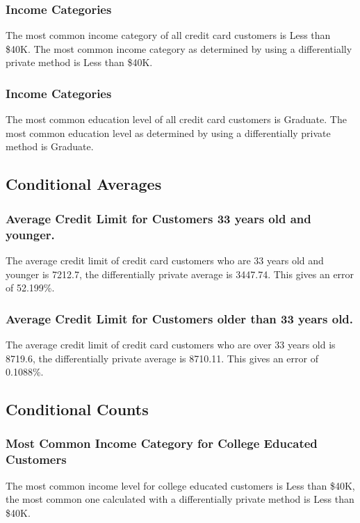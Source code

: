 \documentclass{article}%
\begin{document}
\subsubsection{Income Categories}%
\label{ssubsec:IncomeCategories}%
The most common income category of all credit card customers is Less than \$40K. The most common income category as determined by using a differentially private method is Less than \$40K.

%
\subsubsection{Income Categories}%
\label{ssubsec:IncomeCategories}%
The most common education level of all credit card customers is Graduate. The most common education level as determined by using a differentially private method is Graduate.

%
\subsection{Conditional Averages}%
\label{subsec:ConditionalAverages}%
\subsubsection{Average Credit Limit for Customers 33 years old and younger.}%
\label{ssubsec:AverageCreditLimitforCustomers33yearsoldandyounger.}%
The average credit limit of credit card customers who are 33 years old and younger is 7212.7, the differentially private average is 3447.74. This gives an error of 52.199\%.

%
\subsubsection{Average Credit Limit for Customers older than 33 years old.}%
\label{ssubsec:AverageCreditLimitforCustomersolderthan33yearsold.}%
The average credit limit of credit card customers who are over 33 years old is 8719.6, the differentially private average is 8710.11. This gives an error of 0.1088\%.

%
\subsection{Conditional Counts}%
\label{subsec:ConditionalCounts}%
\subsubsection{Most Common Income Category for College Educated Customers}%
\label{ssubsec:MostCommonIncomeCategoryforCollegeEducatedCustomers}%
The most common income level for college educated customers is Less than \$40K, the most common one calculated with a differentially private method is Less than \$40K. 
\end{document}
